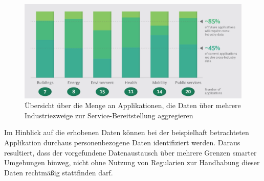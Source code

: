 \begin{figure}[bp!]
    \centering
    \includegraphics[scale=0.2]{main/pictures/smart_city/Smart_City_Apps_Data_Req}
    \caption{Übersicht über die Menge an Applikationen, die Daten über mehrere Industriezweige zur Service-Bereitstellung aggregieren \cite{BCG2020}}
    \label{fig:data-aggregation-smart-city-apps}
\end{figure}

\noindent Im Hinblick auf die erhobenen Daten können bei der beispielhaft betrachteten Applikation durchaus personenbezogene Daten identifiziert werden. Daraus resultiert, dass der vorgefundene Datenaustausch über mehrere Grenzen smarter Umgebungen hinweg, nicht ohne Nutzung von Regularien zur Handhabung dieser Daten rechtmäßig stattfinden darf.\\


